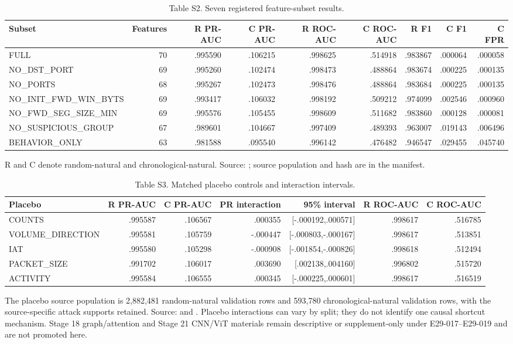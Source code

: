 \documentclass[preprint,12pt]{elsarticle}
\begin{document}
\begin{table}[htbp]
\centering\tiny
\caption{Table S2. Seven registered feature-subset results.}
\begin{tabular}{@{}lrrrrrrrr@{}}
\toprule
Subset & Features & R PR-AUC & C PR-AUC & R ROC-AUC & C ROC-AUC & R F1 & C F1 & C FPR\\
\midrule
FULL & 70 & .995590 & .106215 & .998625 & .514918 & .983867 & .000064 & .000058\\
NO\_DST\_PORT & 69 & .995260 & .102474 & .998473 & .488864 & .983674 & .000225 & .000135\\
NO\_PORTS & 68 & .995267 & .102473 & .998476 & .488864 & .983684 & .000225 & .000135\\
NO\_INIT\_FWD\_WIN\_BYTS & 69 & .993417 & .106032 & .998192 & .509212 & .974099 & .002546 & .000960\\
NO\_FWD\_SEG\_SIZE\_MIN & 69 & .995576 & .105455 & .998609 & .511682 & .983860 & .000128 & .000081\\
NO\_SUSPICIOUS\_GROUP & 67 & .989601 & .104667 & .997409 & .489393 & .963007 & .019143 & .006496\\
BEHAVIOR\_ONLY & 63 & .981588 & .095540 & .996142 & .476482 & .946547 & .029455 & .045740\\
\bottomrule
\end{tabular}
\end{table}
R and C denote random-natural and chronological-natural. Source: ; source population and hash are in the manifest.

\begin{table}[htbp]
\centering\tiny
\caption{Table S3. Matched placebo controls and interaction intervals.}
\begin{tabular}{@{}lrrrrrr@{}}
\toprule
Placebo & R PR-AUC & C PR-AUC & PR interaction & 95\% interval & R ROC-AUC & C ROC-AUC\\
\midrule
COUNTS & .995587 & .106567 & .000355 & [-.000192,.000571] & .998617 & .516785\\
VOLUME\_DIRECTION & .995581 & .105759 & -.000447 & [-.000803,-.000167] & .998617 & .513851\\
IAT & .995580 & .105298 & -.000908 & [-.001854,-.000826] & .998618 & .512494\\
PACKET\_SIZE & .991702 & .106017 & .003690 & [.002138,.004160] & .996802 & .515720\\
ACTIVITY & .995584 & .106555 & .000345 & [-.000225,.000601] & .998617 & .516519\\
\bottomrule
\end{tabular}
\end{table}
The placebo source population is 2,882,481 random-natural validation rows and 593,780 chronological-natural validation rows, with the source-specific attack supports retained. Source:  and . Placebo interactions can vary by split; they do not identify one causal shortcut mechanism. Stage 18 graph/attention and Stage 21 CNN/ViT materials remain descriptive or supplement-only under E29-017--E29-019 and are not promoted here.
\end{document}
